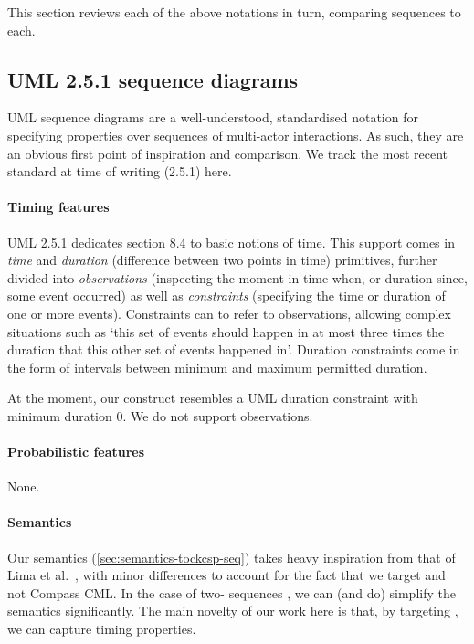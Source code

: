 
This section reviews each of the above notations in turn, comparing
\langname{} sequences to each.

\subsection{UML 2.5.1 sequence diagrams}

UML sequence diagrams are a well-understood, standardised notation for
specifying properties over sequences of multi-actor interactions.  As such, they
are an obvious first point of inspiration and comparison.  We track the most
recent standard at time of writing (2.5.1) here.

\paragraph{Timing features}
UML 2.5.1 dedicates section 8.4 to basic notions of time.  This
support comes in \emph{time} and \emph{duration} (difference between two points
in time) primitives, further divided into \emph{observations} (inspecting the
moment in time when, or duration since, some event occurred) as well as
\emph{constraints} (specifying the time or duration of one or more events).
Constraints can to refer to observations, allowing complex situations such as
`this set of events should happen in at most three times the duration that
this other set of events happened in'.  Duration constraints come in the
form of intervals between minimum and maximum permitted duration.

At the moment, our \mdeadlinestep{} construct resembles a UML duration
constraint with minimum duration \(0\).  We do not support observations.

\paragraph{Probabilistic features}
None.  

\paragraph{Semantics}
Our semantics (\cref{sec:semantics-tockcsp-seq}) takes heavy inspiration from
that of Lima et al.~\cite{lima-semantics}, with minor differences to account
for the fact that we target \tockcsp{} and not Compass CML.  In the case of
two-\mactor{} sequences , we can (and do)
simplify the semantics significantly.
The main novelty of our work here is that, by targeting \tockcsp, we can capture
timing properties.

